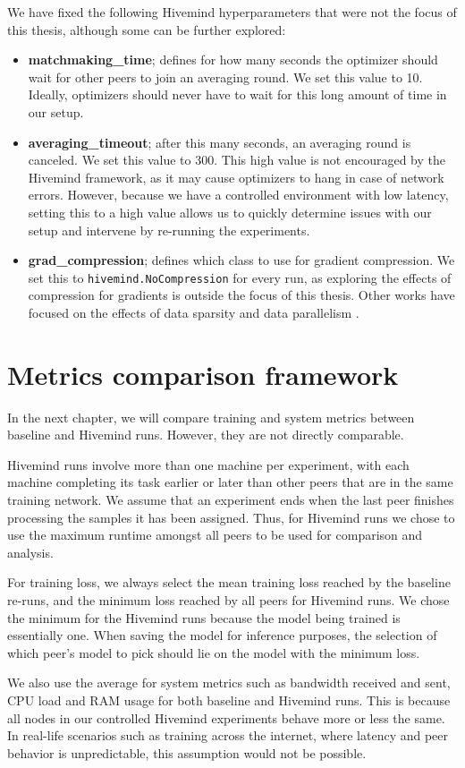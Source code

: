 We have fixed the following Hivemind hyperparameters that were not the focus of this thesis, although some can be further explored:
\begin{itemize}
    \item \textbf{matchmaking\_time}; defines for how many seconds the optimizer should wait for other peers to join an averaging round.
          We set this value to 10.
          Ideally, optimizers should never have to wait for this long amount of time in our setup.
    \item \textbf{averaging\_timeout}; after this many seconds, an averaging round is canceled.
          We set this value to 300.
          This high value is not encouraged by the Hivemind framework, as it may cause optimizers to hang in case of network errors.
          However, because we have a controlled environment with low latency, setting this to a high value allows us to quickly determine issues with our setup and intervene by re-running the experiments.
    \item \textbf{grad\_compression}; defines which class to use for gradient compression.
          We set this to \texttt{hivemind.NoCompression} for every run, as exploring the effects of compression for gradients is outside the focus of this thesis.
          Other works have focused on the effects of data sparsity and data parallelism \cite{DBLP:journals/corr/abs-2003-11316}.
\end{itemize}

\section{Metrics comparison framework}

In the next chapter, we will compare training and system metrics between baseline and Hivemind runs.
However, they are not directly comparable.

Hivemind runs involve more than one machine per experiment, with each machine completing its task earlier or later than other peers that are in the same training network.
We assume that an experiment ends when the last peer finishes processing the samples it has been assigned.
Thus, for Hivemind runs we chose to use the maximum runtime amongst all peers to be used for comparison and analysis.

For training loss, we always select the mean training loss reached by the baseline re-runs, and the minimum loss reached by all peers for Hivemind runs.
We chose the minimum for the Hivemind runs because the model being trained is essentially one.
When saving the model for inference purposes, the selection of which peer's model to pick should lie on the model with the minimum loss.

We also use the average for system metrics such as bandwidth received and sent, CPU load and RAM usage for both baseline and Hivemind runs.
This is because all nodes in our controlled Hivemind experiments behave more or less the same.
In real-life scenarios such as training across the internet, where latency and peer behavior is unpredictable, this assumption would not be possible.

